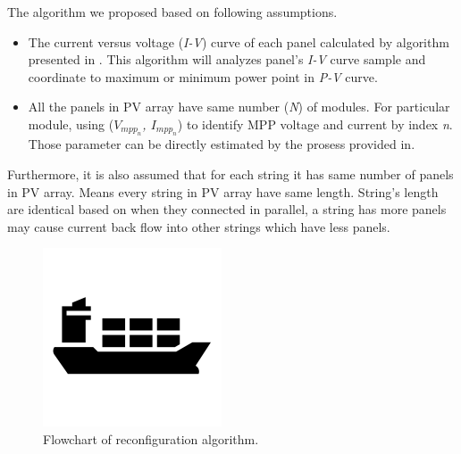 \documentclass[conference]{IEEEtran}
\begin{document}
The algorithm we proposed based on following assumptions.

\begin{itemize}
\item The current versus voltage (\textit{I-V}) curve of each panel calculated by algorithm presented in \cite{b6}. This algorithm will analyzes panel's \textit{I-V} curve sample and coordinate to maximum or minimum power point in \textit{P-V} curve.
\item All the panels in PV array have same number (\textit{N}) of modules. For particular module, using (\textit{$V_{mpp_n}$, $I_{mpp_n}$}) to identify MPP voltage and current by index \textit{n}. Those parameter can be directly estimated by the prosess provided in\cite{b7}.
\end{itemize}

Furthermore, it is also assumed that for each string it has same number of panels in PV array. Means every string in PV array have same length. String's length are identical based on when they connected in parallel, a string has more panels may cause current back flow into other strings which have less panels\cite{b8}.
\begin{figure}[htbp]
\centerline{\includegraphics{fig1.png}}
\caption{Flowchart of reconfiguration algorithm.}
\label{fig2}
\end{figure}
\end{document}
